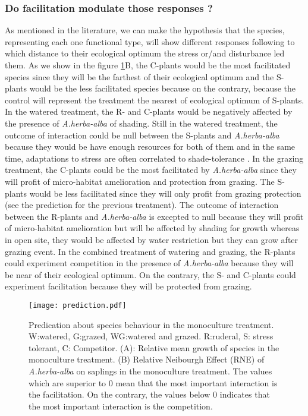 \documentclass[12pt]{article} %
\begin{document}
\subsubsection{Do facilitation modulate those responses ?}
As mentioned in the literature, we can make the hypothesis that the species, representing each one functional type, will show different responses following to which distance to their ecological optimum the stress or/and disturbance led them. As we show in the figure \ref{pred}B, the C-plants would be the most facilitated species since they will be the farthest of their ecological optimum and the S-plants would be the less facilitated species because on the contrary, because the control will represent the treatment the nearest of ecological optimum of S-plants. In the watered treatment, the R- and C-plants would be negatively affected by the presence of \textit{A.herba-alba} of shading. Still in the watered treatment, the outcome of interaction could be null between the S-plants and \textit{A.herba-alba} because they would be have enough resources for both of them and in the same time, adaptations to stress are often correlated to shade-tolerance \citep{Grime1977a}. In the grazing treatment, the C-plants could be the most facilitated by \textit{A.herba-alba} since they will profit of micro-habitat amelioration and protection from grazing. The S-plants would be less facilitated since they will only profit from grazing protection (see the prediction for the previous treatment). The outcome of interaction between the R-plants and \textit{A.herba-alba} is excepted to null because they will profit of micro-habitat amelioration but will be affected by shading for growth whereas in open site, they would be affected by water restriction but they can grow after grazing event. In the combined treatment of watering and grazing, the R-plants could experiment competition in the presence of \textit{A.herba-alba} because they will be near of their ecological optimum. On the contrary, the S- and C-plants could experiment facilitation because they will be protected from grazing.
\begin{figure} %
\begin{center}
\texttt{[image: prediction.pdf]}
\end{center}
\caption{Predication about species behaviour in the monoculture treatment. W:watered, G:grazed, WG:watered and grazed. R:ruderal, S: stress tolerant, C: Competitor. (A): Relative mean growth of species in the monoculture treatment. (B) Relative Neibourgh Effect (RNE) of \textit{A.herba-alba} on saplings in the monoculture treatment. The values which are superior to 0 mean that the most important interaction is the facilitation. On the contrary, the values below 0 indicates that the most important interaction is the competition.\label{pred}}
\end{figure}
\end{document}
